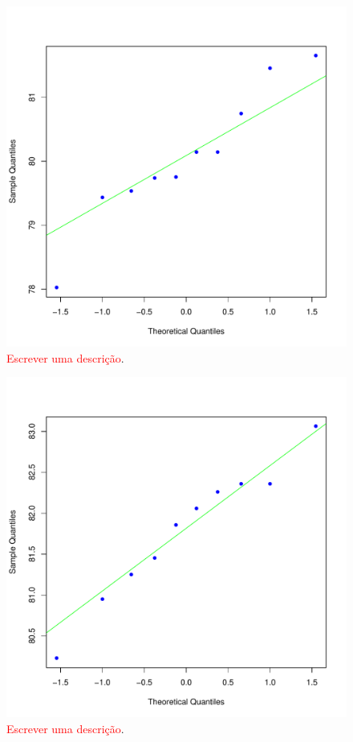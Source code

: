 \documentclass[conference]{IEEEtran}
\begin{document}
\begin{figure}[h]
	\centering
	\includegraphics[width=\linewidth]{img/bluenorm_mfdr.pdf}
	\caption{\textcolor{red}{Escrever uma descrição}.}
	\label{fig:hist_mfdr}
\end{figure}

\begin{figure}[h]
	\centering
	\includegraphics[width=\linewidth]{img/bluenorm_mfd.pdf}
	\caption{\textcolor{red}{Escrever uma descrição}.}
	\label{fig:hist_mfd}
\end{figure}
\end{document}
